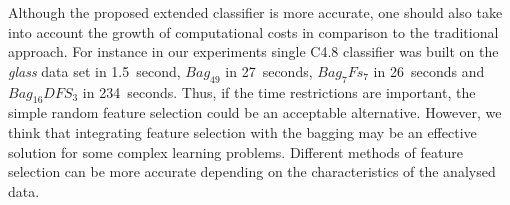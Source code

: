 \documentclass[runningheads]{llncs}
\begin{document}
Although the proposed extended classifier is more accurate, one should also
take into account the growth of computational costs in comparison to the
traditional approach.  For instance in our experiments single C4.8
classifier was built on the {\em glass} data set in 1.5~second, $Bag_{49}$
in 27~seconds, $Bag_7Fs_7$ in 26~seconds and $Bag_{16}DFS_3$ in 234~seconds.
Thus, if the time restrictions are important, the simple random feature
selection could be an acceptable alternative. However, we think that
integrating feature selection with the bagging may be an effective solution
for some complex learning problems. Different methods of feature selection
can be more accurate depending on the characteristics of the analysed data.


\end{document}

